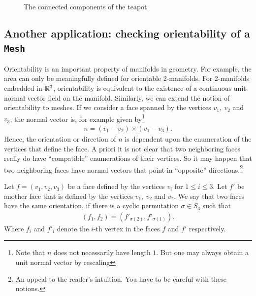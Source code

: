 \begin{ex}
\begin{figure}[ht]
    \hfil
    \caption{The connected components of the teapot}
    \label{fig:teapotcomps}
\end{figure}
\end{ex}
\subsection{Another application: checking orientability of a \texttt{Mesh}}
Orientability is an important property of manifolds in geometry. For example, the area can only be meaningfully defined for orientable 2-manifolds. For 2-manifolds embedded in $\mathbb{R}^3$, orientability is equivalent to the existence of a continuous unit-normal vector field on the manifold. Similarly, we can extend the notion of orientability to meshes. If we consider a face spanned by the vertices $v_1,\ v_2$ and $v_3$, the normal vector is, for example given by\footnote{Note that $n$ does not necessarily have length $1$. But one may always obtain a unit normal vector by rescaling}
\begin{align*}
    n = (v_1 - v_2)\times (v_1 - v_3).
\end{align*}
Hence, the orientation or direction of $n$ is dependent upon the enumeration of the vertices that define the face. A priori it is not clear that two neighboring faces really do have ``compatible'' enumerations of their vertices. So it may happen that two neighboring faces have normal vectors that point in ``opposite'' directions.\footnote{An appeal to the reader's intuition. You have to be careful with these notions.}
\begin{defi}
    Let $f = (v_1, v_2, v_3)$ be a face defined by the vertices $v_i$ for $1\leq i\leq 3$. Let $f'$ be another face that is defined by the vertices $v_1,\ v_2$ and $v_{\ast}$. We say that two faces have the same orientation, if there is a cyclic permutation $\sigma\in S_3$ such that
    \begin{align*}
        (f_1, f_2) = (f'_{\sigma(2)},f'_{\sigma(1)}).
    \end{align*}
    Where $f_i$ and $f'_i$ denote the $i$-th vertex in the faces $f$ and $f'$ respectively.
\end{defi}
